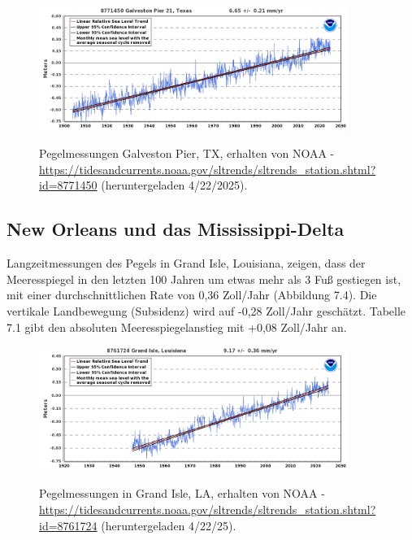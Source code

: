\documentclass[12pt,paper=a4,DIV=12,parskip=never,chapterprefix=false,headings=standardclasses]{scrreprt}
\begin{document}
\begin{figure}[H]
\begin{center}
\includegraphics[width=0.9\textwidth]{bilder/bilderKlima-0070.png}\\[1cm]
\end{center}
\caption{Pegelmessungen Galveston Pier, TX, erhalten von NOAA - \url{https://tidesandcurrents.noaa.gov/sltrends/sltrends_station.shtml?id=8771450} (heruntergeladen 4/22/2025).}
\end{figure}

\subsection*{New Orleans und das Mississippi-Delta}
Langzeitmessungen des Pegels in Grand Isle, Louisiana, zeigen, dass der Meeresspiegel in den letzten 100 Jahren um etwas mehr als 3 Fuß gestiegen ist, mit einer durchschnittlichen Rate von 0,36 Zoll/Jahr (Abbildung 7.4).
Die vertikale Landbewegung (Subsidenz) wird auf -0,28 Zoll/Jahr geschätzt. Tabelle 7.1 gibt den absoluten Meeresspiegelanstieg mit +0,08 Zoll/Jahr an.

\begin{figure}[H]
\begin{center}
\includegraphics[width=0.9\textwidth]{bilder/bilderKlima-0071.png}\\[1cm]
\end{center}
\caption{Pegelmessungen in Grand Isle, LA, erhalten von NOAA - \url{https://tidesandcurrents.noaa.gov/sltrends/sltrends_station.shtml?id=8761724} (heruntergeladen 4/22/25).}
\end{figure}
\end{document}
